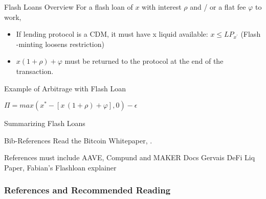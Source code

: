 \documentclass[handout]{beamer}
\begin{document}
\begin{frame}{Flash Loans Overview}
For a flash loan of $x$ with interest $\rho$ and / or a flat fee $\varphi$ to work,

\vspace{1em}
\begin{itemize}
\item If lending protocol is a CDM, it must have x liquid available:  $x \leq LP_{x^{'}}$ (Flash -minting loosens restriction)


\item  $ x(1+\rho) + \varphi$ must be returned to the protocol at the end of the transaction.


\end{itemize}

	
\end{frame}


\begin{frame}{Example of Arbitrage with Flash Loan}

$\Pi = max (x^{*}-[x \,(1+\rho) + \varphi ],0) - \epsilon$
	
\end{frame}


\begin{frame}{Summarizing Flash Loans}

	
\end{frame}


\begin{frame}{Bib-References}
		Read the Bitcoin Whitepaper, \cite{nakamotoBitcoin2008}.
\end{frame}

\begin{frame}%

References must include AAVE, Compund and MAKER Docs
Gervais DeFi Liq Paper, Fabian's Flashloan explainer

\frametitle{References and Recommended Reading}
	
	
\end{frame}
\end{document}
